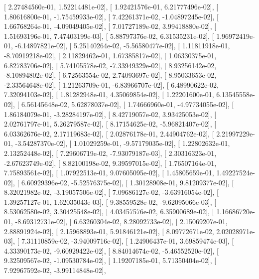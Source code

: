 \documentclass{article}
\begin{document}
       [  2.27484560e-01,   1.52214481e-02],
       [  1.92421576e-01,   6.21777496e-02],
       [  1.80616800e-01,  -1.75459933e-02],
       [  7.42261371e-02,  -1.04897245e-02],
       [  1.66768264e-01,  -4.09049405e-02],
       [  7.01727189e-02,   3.99418880e-02],
       [  1.51693196e-01,   7.47403199e-03],
       [  5.88797376e-02,   6.31535231e-02],
       [  1.96972419e-01,  -6.14897821e-02],
       [  5.25140264e-02,  -5.56580477e-02],
       [  1.11811918e-01,  -8.70919218e-02],
       [  2.11829462e-01,   1.67385817e-02],
       [  1.06330375e-01,   6.82783706e-02],
       [  5.74105578e-02,  -7.33949329e-02],
       [  8.93256142e-02,  -8.10894802e-02],
       [  6.72563554e-02,   2.74093697e-02],
       [  8.95033653e-02,  -2.33564648e-02],
       [  1.21263709e-01,  -6.83966707e-02],
       [  6.48990622e-02,   7.32094103e-02],
       [  1.81282948e-01,   4.35069854e-02],
       [  1.22201600e-01,   6.13545558e-02],
       [  6.56145648e-02,   5.62878037e-02],
       [  1.74666960e-01,  -4.97734055e-02],
       [  1.86184079e-01,  -3.28284197e-02],
       [  8.42719057e-02,   3.93425053e-02],
       [  2.02761797e-01,   5.26279587e-02],
       [  8.17154625e-02,  -5.96821407e-02],
       [  6.03362676e-02,   2.17119683e-02],
       [  2.02876178e-01,   2.44904762e-02],
       [  2.21997229e-01,  -3.54287370e-02],
       [  1.01029259e-01,  -9.57179035e-02],
       [  1.22802632e-01,   2.13252448e-02],
       [  7.29606719e-02,  -7.93079187e-03],
       [  2.30316323e-01,  -2.67623749e-02],
       [  8.82100198e-02,   9.39597015e-02],
       [  1.76507164e-01,   7.75893561e-02],
       [  1.07922513e-01,   9.07605095e-02],
       [  1.45805659e-01,   1.49227524e-02],
       [  6.60929396e-02,  -5.52576375e-02],
       [  1.30128908e-01,   9.81209377e-02],
       [  8.32021982e-02,  -3.19057506e-02],
       [  7.09686127e-02,  -3.63916054e-02],
       [  1.39257127e-01,   1.62035043e-03],
       [  9.38559528e-02,  -9.62095066e-03],
       [  8.53062580e-02,   3.30425548e-02],
       [  4.03457576e-02,   6.35900689e-02],
       [  1.16686720e-01,  -8.69312731e-02],
       [  6.63260304e-02,   8.28092733e-02],
       [  2.15069207e-01,   2.88891924e-02],
       [  2.15968893e-01,   5.91846121e-02],
       [  8.09772671e-02,   2.02028971e-03],
       [  7.31110859e-02,  -3.94009716e-02],
       [  1.24906437e-01,   3.69859474e-03],
       [  4.33390173e-02,  -9.60929422e-02],
       [  8.84014674e-02,  -5.46552520e-02],
       [  9.32509567e-02,  -1.09530784e-02],
       [  1.19207185e-01,   5.71350404e-02],
       [  7.92967592e-02,  -3.99114848e-02],
\end{document}
